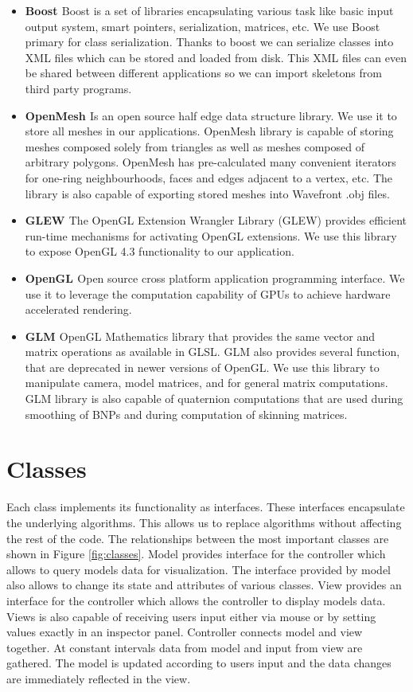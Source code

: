 \begin{itemize}
	\item \textbf{Boost \cite{Boost}} Boost is a set of libraries encapsulating various task like basic input output system, smart pointers, serialization, matrices, etc. We use Boost primary for class serialization. Thanks to boost we can serialize classes into XML files which can be stored and loaded from disk. This XML files can even be shared between different applications so we can import skeletons from third party programs.
	\item \textbf{OpenMesh \cite{OpenMesh}} Is an open source half edge data structure library. We use it to store all meshes in our applications. OpenMesh library is capable of storing meshes composed solely from triangles as well as meshes composed of arbitrary polygons. OpenMesh has pre-calculated many convenient iterators for one-ring neighbourhoods, faces and edges adjacent to a vertex, etc. The library is also capable of exporting stored meshes into Wavefront .obj files.
	\item \textbf{GLEW \cite{glew}} The OpenGL Extension Wrangler Library (GLEW) provides efficient run-time mechanisms for activating OpenGL extensions. We use this library to expose OpenGL 4.3 functionality to our application.
	\item \textbf{OpenGL \cite{opengl}} Open source cross platform application programming interface. We use it to leverage the computation capability of GPUs to achieve hardware accelerated rendering.
	\item \textbf{GLM \cite{glm}} OpenGL Mathematics library that provides the same vector and matrix operations as available in GLSL. GLM also provides several function, that are deprecated in newer versions of OpenGL. We use this library to manipulate camera, model matrices, and for general matrix computations. GLM library is also capable of quaternion computations that are used during smoothing of BNPs and during computation of skinning matrices.
\end{itemize}

\pagebreak

\section{Classes}

Each class implements its functionality as interfaces.
These interfaces encapsulate the underlying algorithms.
This allows us to replace algorithms without affecting the rest of the code.
The relationships between the most important classes are shown in Figure \ref{fig:classes}.
Model provides interface for the controller which allows to query models data for visualization.
The interface provided by model also allows to change its state and attributes of various classes.
View provides an interface for the controller which allows the controller to display models data.
Views is also capable of receiving users input either via mouse or by setting values exactly in an inspector panel.
Controller connects model and view together.
At constant intervals data from model and input from view are gathered.
The model is updated according to users input and the data changes are immediately reflected in the view.

